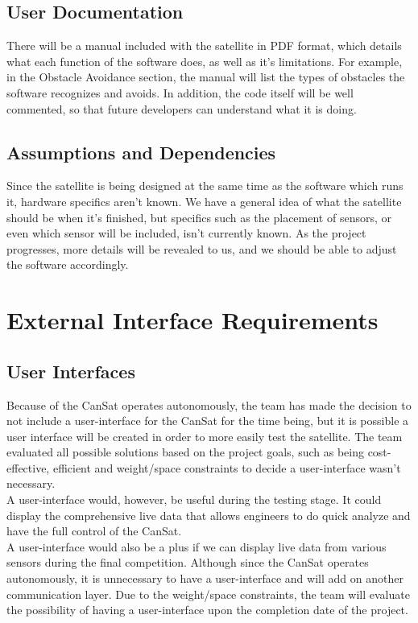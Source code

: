 \documentclass{scrreprt}
\begin{document}
\section{User Documentation}
There will be a manual included with the satellite in PDF format, which details what each function of the software does, as well as it's limitations. For example, in the Obstacle Avoidance section, the manual will list the types of obstacles the software recognizes and avoids. In addition, the code itself will be well commented, so that future developers can understand what it is doing.

\section{Assumptions and Dependencies}
Since the satellite is being designed at the same time as the software which runs it, hardware specifics aren't known. We have a general idea of what the satellite should be when it's finished, but specifics such as the placement of sensors, or even which sensor will be included, isn't currently known. As the project progresses, more details will be revealed to us, and we should be able to adjust the software accordingly.

\chapter{External Interface Requirements}

\section{User Interfaces}
Because of the CanSat operates autonomously, the team has made the decision to not include a user-interface for the CanSat for the time being, but it is possible a user interface will be created in order to more easily test the satellite. The team evaluated all possible solutions based on the project goals, such as being cost-effective, efficient and weight/space constraints to decide a user-interface wasn't necessary.\\
A user-interface would, however, be useful during the testing stage. It could display the comprehensive live data that allows engineers to do quick analyze and have the full control of the CanSat. \\
A user-interface would also be a plus if we can display live data from various sensors during the final competition. Although since the CanSat operates autonomously, it is unnecessary to have a user-interface and will add on another communication layer. Due to the weight/space constraints, the team will evaluate the possibility of having a user-interface upon the completion date of the project.
\end{document}
